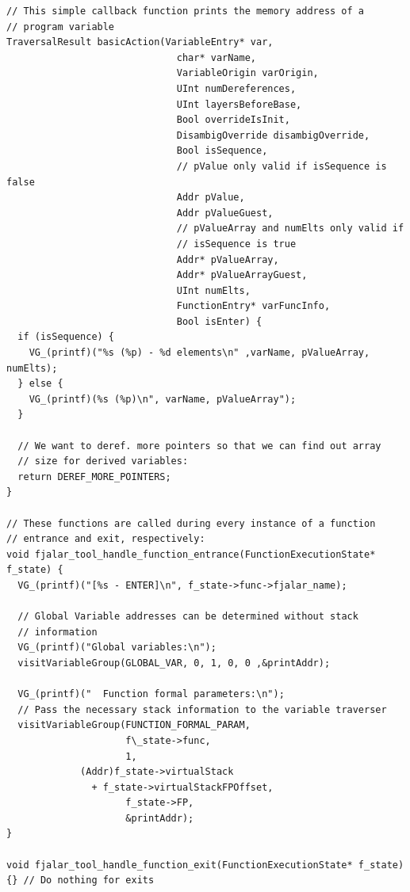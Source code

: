 \documentclass{article}
\begin{document}
\begin{center}
\begin{lstlisting}
// This simple callback function prints the memory address of a
// program variable
TraversalResult basicAction(VariableEntry* var,
                              char* varName,
                              VariableOrigin varOrigin,
                              UInt numDereferences,
                              UInt layersBeforeBase,
                              Bool overrideIsInit,
                              DisambigOverride disambigOverride,
                              Bool isSequence,
                              // pValue only valid if isSequence is false
                              Addr pValue,
                              Addr pValueGuest,
                              // pValueArray and numElts only valid if
                              // isSequence is true
                              Addr* pValueArray,
                              Addr* pValueArrayGuest,
                              UInt numElts,
                              FunctionEntry* varFuncInfo,
                              Bool isEnter) {
  if (isSequence) {
    VG_(printf)("%s (%p) - %d elements\n" ,varName, pValueArray,  numElts);
  } else {
    VG_(printf)(%s (%p)\n", varName, pValueArray");
  }

  // We want to deref. more pointers so that we can find out array
  // size for derived variables:
  return DEREF_MORE_POINTERS;
}

// These functions are called during every instance of a function
// entrance and exit, respectively:
void fjalar_tool_handle_function_entrance(FunctionExecutionState* f_state) {
  VG_(printf)("[%s - ENTER]\n", f_state->func->fjalar_name);
  
  // Global Variable addresses can be determined without stack
  // information
  VG_(printf)("Global variables:\n");
  visitVariableGroup(GLOBAL_VAR, 0, 1, 0, 0 ,&printAddr);

  VG_(printf)("  Function formal parameters:\n");
  // Pass the necessary stack information to the variable traverser
  visitVariableGroup(FUNCTION_FORMAL_PARAM,
                     f\_state->func,
                     1,
		     (Addr)f_state->virtualStack
		       + f_state->virtualStackFPOffset,
                     f_state->FP,
                     &printAddr);
}

void fjalar_tool_handle_function_exit(FunctionExecutionState* f_state)
{} // Do nothing for exits
\end{lstlisting}
\end{center}



\end{document}
